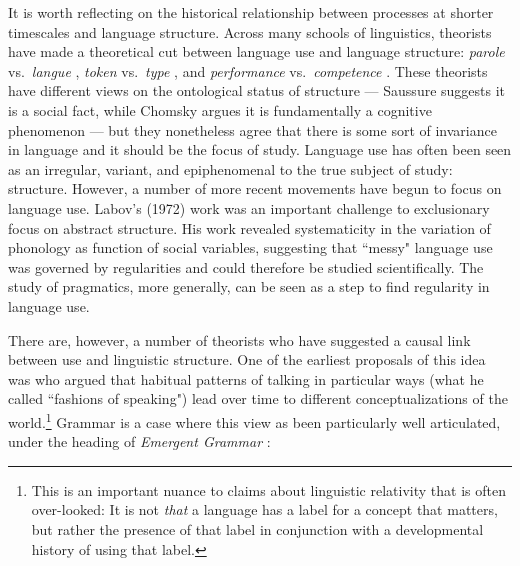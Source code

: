 It is worth reflecting on the historical relationship between processes at shorter timescales and language structure. Across many schools of linguistics, theorists have made a theoretical cut between language use and language structure: {\it parole} vs.\  {\it langue}  \cite{saussure},  {\it token}  vs.\  {\it type}  \cite{peirce}, and  {\it performance}  vs.\  {\it competence}  \cite{chomsky1965aspects}. These theorists  have different views on the ontological status of structure --- Saussure suggests it is a social fact, while Chomsky argues it is fundamentally a cognitive phenomenon --- but they nonetheless agree that there is some sort of invariance in language and it should be the focus of study. Language use has often been seen as an irregular, variant, and epiphenomenal to the true subject of study: structure. However, a number of more recent movements have begun to focus on language use. \nocite{labov197213} Labov's (1972) work was an important challenge to exclusionary focus on abstract structure. His work revealed systematicity in the variation of phonology as function of social variables, suggesting that ``messy" language use was governed by regularities and could therefore be studied scientifically. The study of pragmatics, more generally, can be seen as a step to find regularity in language use. 

There are, however, a number of theorists who have suggested a causal link between use and linguistic structure. One of the earliest proposals of this idea was  who argued that habitual patterns of talking in particular ways (what he called ``fashions of speaking") lead over time to different conceptualizations of the world.\footnote{This is an important nuance to claims about linguistic relativity that is often over-looked: It is not {\it that} a language has a label for a concept that matters,  but rather the presence of that label in conjunction with a developmental history of using that label.} Grammar is a case where this view as been particularly well articulated, under the heading of {\it Emergent Grammar} \cite{hopper1987emergent}: 

